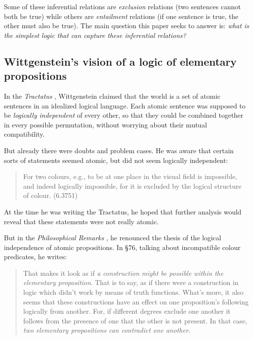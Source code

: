\NI Some of these inferential relations are \emph{exclusion}
relations (two sentences cannot both be true) while others are
\emph{entailment} relations (if one sentence is true, the other must
also be true).  The main question this paper seeks to answer is:
\emph{what is the simplest logic that can capture these inferential
  relations?}

\subsection{Wittgenstein's vision of a logic of elementary propositions}

\NI In the \emph{Tractatus} \cite{wittgenstein-tractatus}, Wittgenstein
claimed that the world is a set of atomic sentences in an idealized
logical language.  Each atomic sentence was supposed to be
\emph{logically independent} of every other, so that they could be
combined together in every possible permutation, without worrying
about their mutual compatibility.

But already there were doubts and problem cases.  He was aware that
certain sorts of statements seemed atomic, but did not seem logically
independent:

\begin{quote}
  For two colours, e.g., to be at one place in the visual field is
  impossible, and indeed logically impossible, for it is excluded by
  the logical structure of colour. (6.3751)
\end{quote}

\NI At the time he was writing the Tractatus, he hoped that further
analysis would reveal that these statements were not really atomic.

But in the \emph{Philosophical Remarks} \cite{wittgenstein-remarks}, he
renounced the thesis of the logical independence of atomic
propositions.  In \S 76, talking about incompatible colour predicates,
he writes:

\begin{quote}
  That makes it look as if \emph{a construction might be possible
    within the elementary proposition}. That is to say, as if there
  were a construction in logic which didn't work by means of truth
  functions.  What's more, it also seems that these constructions have
  an effect on one proposition's following logically from another.
  For, if different degrees exclude one another it follows from the
  presence of one that the other is not present.  In that case,
  \emph{two elementary propositions can contradict one another}.
\end{quote}

